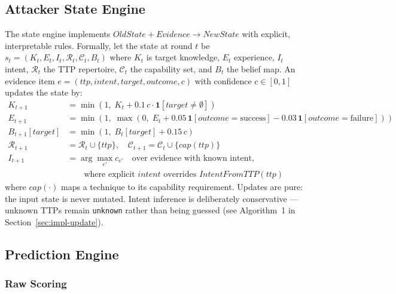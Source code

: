 \documentclass[preprints,article,accept,oneauthor]{Definitions/mdpi}
\newcommand{\act}[1]{\texttt{#1}}
\begin{document}
\subsection{Attacker State Engine}
\label{sec:state-engine}

The state engine implements
$\mathit{OldState} + \mathit{Evidence} \to \mathit{NewState}$ with explicit,
interpretable rules. Formally, let the state at round $t$ be
$s_t = (K_t, E_t, I_t, \mathcal{R}_t, \mathcal{C}_t, B_t)$ where $K_t$ is
target knowledge, $E_t$ experience, $I_t$ intent, $\mathcal{R}_t$ the TTP
repertoire, $\mathcal{C}_t$ the capability set, and $B_t$ the belief map.
An evidence item $e = (\mathit{ttp}, \mathit{intent}, \mathit{target},
\mathit{outcome}, c)$ with confidence $c \in [0,1]$ updates the state by:
\begin{align}
K_{t+1} &= \min(1,\; K_t + 0.1\, c \cdot \mathbf{1}[\mathit{target}
\neq \emptyset]) \label{eq:know} \\
E_{t+1} &= \min(1,\; \max(0,\; E_t + 0.05\,\mathbf{1}[\mathit{outcome}
= \text{success}] - 0.03\,\mathbf{1}[\mathit{outcome} = \text{failure}]))
\label{eq:exp} \\
B_{t+1}[\mathit{target}] &= \min(1,\; B_t[\mathit{target}]
+ 0.15\, c) \label{eq:belief} \\
\mathcal{R}_{t+1} &= \mathcal{R}_t \cup \{\mathit{ttp}\},
\quad \mathcal{C}_{t+1} = \mathcal{C}_t \cup \{\mathit{cap}(\mathit{ttp})\}
\label{eq:repertoire} \\
I_{t+1} &= \arg\max_{e'} c_{e'} \quad \text{over evidence with known intent,} \label{eq:intent} \\
&\qquad \text{where explicit $\mathit{intent}$ overrides $\mathit{IntentFromTTP}(\mathit{ttp})$} \nonumber
\end{align}
where $\mathit{cap}(\cdot)$ maps a technique to its capability requirement.
Updates are pure: the input state is never mutated. Intent inference is
deliberately conservative --- unknown TTPs remain \act{unknown} rather than
being guessed (see Algorithm~1 in Section~\ref{sec:impl-update}).

\subsection{Prediction Engine}
\label{sec:predictor}

\subsubsection{Raw Scoring}
\label{sec:prediction-formal}
\end{document}
